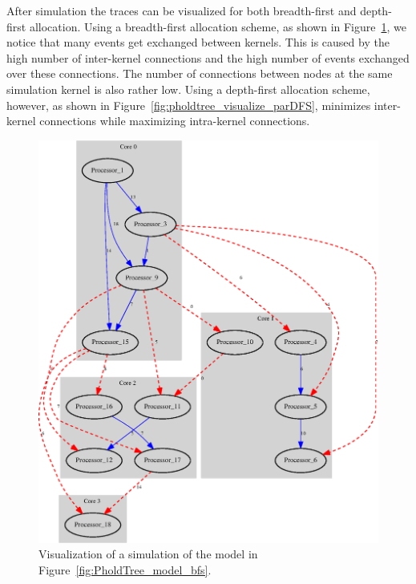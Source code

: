 After simulation the traces can be visualized for both breadth-first and depth-first allocation.
Using a breadth-first allocation scheme, as shown in Figure~\ref{fig:pholdtree_visualize_parBFS}, we notice that many events get exchanged between kernels.
This is caused by the high number of inter-kernel connections and the high number of events exchanged over these connections.
The number of connections between nodes at the same simulation kernel is also rather low.
Using a depth-first allocation scheme, however, as shown in Figure~\ref{fig:pholdtree_visualize_parDFS}, minimizes inter-kernel connections while maximizing intra-kernel connections.

\begin{figure}
    \center
    \includegraphics[width=\columnwidth]{fig/pholdtreed1n3t5000c4BFS.eps}
    \caption{Visualization of a simulation of the model in Figure~\ref{fig:PholdTree_model_bfs}.}
    \label{fig:pholdtree_visualize_parBFS}
\end{figure}

